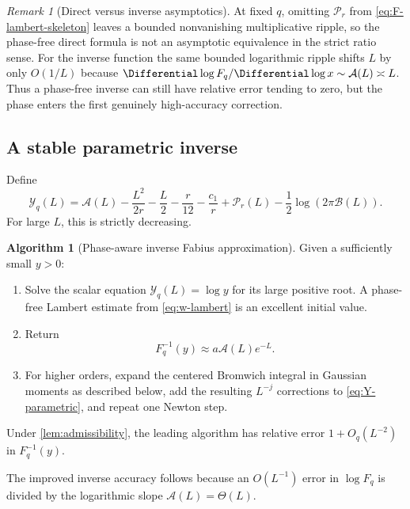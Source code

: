 \documentclass[11pt,oneside]{article}
\theoremstyle{definition}
\newtheorem{algorithm}[theorem]{Algorithm}
\theoremstyle{remark}
\newtheorem{remark}[theorem]{Remark}
\newcommand{\cP}{\mathcal P}
\newcommand{\cA}{\mathcal A}
\newcommand{\cB}{\mathcal B}
\begin{document}
\begin{remark}[Direct versus inverse asymptotics]
At fixed $q$, omitting $\cP_r$ from \eqref{eq:F-lambert-skeleton} leaves a bounded
nonvanishing multiplicative ripple, so the phase-free direct formula is not an
asymptotic equivalence in the strict ratio sense.  For the inverse function the same
bounded logarithmic ripple shifts $L$ by only $O(1/L)$ because
$\Differential\log F_q/\Differential\log x\sim\cA(L)\asymp L$.  Thus a phase-free inverse can still have
relative error tending to zero, but the phase enters the first genuinely high-accuracy
correction.
\end{remark}

\subsection{A stable parametric inverse}

Define
\begin{equation}
 \mathcal Y_q(L)=
 \cA(L)-\frac{L^2}{2r}-\frac L2-\frac r{12}-\frac{c_1}{r}
 +\cP_r(L)-\frac12\log(2\pi\cB(L)).
 \label{eq:Y-parametric}
\end{equation}
For large $L$, this is strictly decreasing.

\begin{algorithm}[Phase-aware inverse Fabius approximation]
\label{alg:inverse}
Given a sufficiently small $y>0$:
\begin{enumerate}[label=\arabic*.]
\item Solve the scalar equation $\mathcal Y_q(L)=\log y$ for its large positive root.
A phase-free Lambert estimate from \eqref{eq:w-lambert} is an excellent initial value.
\item Return
\begin{equation}
 F_q^{-1}(y)\approx a\cA(L)e^{-L}.
 \label{eq:inverse-parametric}
\end{equation}
\item For higher orders, expand the centered Bromwich integral in Gaussian moments as
described below, add the resulting $L^{-j}$ corrections to
\eqref{eq:Y-parametric}, and repeat one Newton step.
\end{enumerate}
Under \cref{lem:admissibility}, the leading algorithm has relative error
$1+O_q(L^{-2})$ in $F_q^{-1}(y)$.
\end{algorithm}

The improved inverse accuracy follows because an $O(L^{-1})$ error in $\log F_q$ is
divided by the logarithmic slope $\cA(L)=\Theta(L)$.
\end{document}
